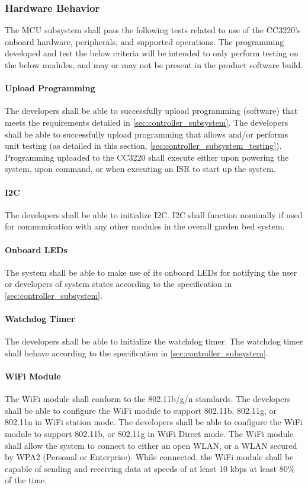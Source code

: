 \subsubsection{Hardware Behavior}
The MCU subsystem shall pass the following tests related to use of the
CC3220's onboard hardware, peripherals, and supported operations. The
programming developed and test the below criteria will be intended to only
perform testing on the below modules, and may or may not be present in the
product software build.

\paragraph{Upload Programming} The developers shall be able to successfully
upload programming (software) that meets the requirements detailed in
\autoref{sec:controller_subsystem}. The developers shall be able to
successfully upload programming that allows and/or performs unit testing
(as detailed in this section, \autoref{sec:controller_subsystem_testing}).
Programming uploaded to the CC3220 shall execute either upon powering the
system, upon command, or when executing an ISR to start up the system.

\paragraph{I2C} The developers shall be able to initialize I2C. I2C shall
function nominally if used for communication with any other modules in the
overall garden bed system.

\paragraph{Onboard LEDs} The system shall be able to make use of its onboard
LEDs for notifying the user or developers of system states according to the specification in \autoref{sec:controller_subsystem}.

\paragraph{Watchdog Timer} The developers shall be able to initialize the
watchdog timer. The watchdog timer shall behave according to the specification in \autoref{sec:controller_subsystem}.

\paragraph{WiFi Module} The WiFi module shall conform to the 802.11b/g/n
standards. The developers shall be able to configure the WiFi
module to support 802.11b, 802.11g, or 802.11n in WiFi station mode.  The 
developers shall be able to configure the WiFi module to support 802.11b, or
802.11g in WiFi Direct mode. The WiFi module shall allow the system to
connect to either an open WLAN, or a WLAN secured by WPA2 (Personal or
Enterprise). While
connected, the WiFi module shall be capable of sending and receiving
data at speeds of at least 10 kbps at least 80\% of the time.

